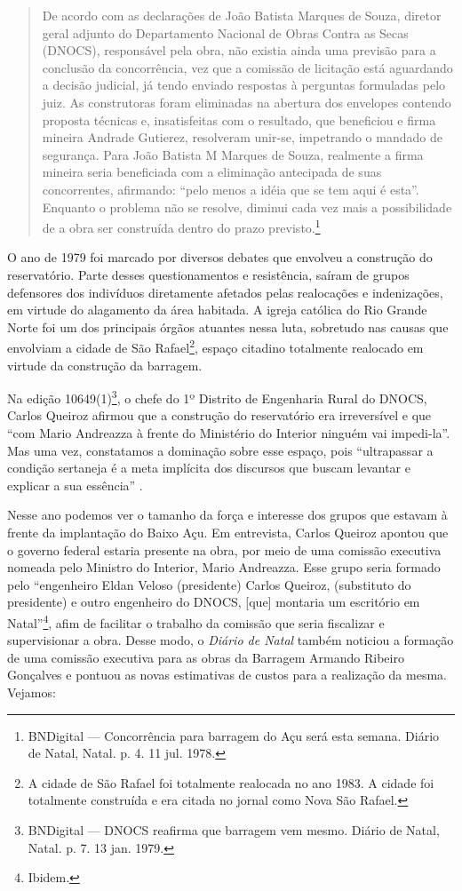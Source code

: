 \begin{refsection}
    \begin{quotation}
        De acordo com as declarações de João Batista Marques de Souza, diretor geral adjunto do Departamento Nacional de Obras Contra as Secas (DNOCS), responsável pela obra, não existia ainda uma previsão para a conclusão da concorrência, vez que a comissão de licitação está aguardando a decisão judicial, já tendo enviado respostas à perguntas formuladas pelo juiz. As construtoras foram eliminadas na abertura dos envelopes contendo proposta técnicas e, insatisfeitas com o resultado, que beneficiou e firma mineira Andrade Gutierez, resolveram unir-se, impetrando o mandado de segurança. Para João Batista M Marques de Souza, realmente a firma mineira seria beneficiada com a eliminação antecipada de suas concorrentes, afirmando: ``pelo menos a idéia que se tem aqui é esta''. Enquanto o problema não se resolve, diminui cada vez mais a possibilidade de a obra ser construída dentro do prazo previsto.\footnote{BNDigital --- Concorrência para barragem do Açu será esta semana. Diário de Natal, Natal. p. 4. 11 jul. 1978. }
    \end{quotation}

    O ano de 1979 foi marcado por diversos debates que envolveu a construção do reservatório. Parte desses questionamentos e resistência, saíram de grupos defensores dos indivíduos diretamente afetados pelas realocações e indenizações, em virtude do alagamento da área habitada. A igreja católica do Rio Grande Norte foi um dos principais órgãos atuantes nessa luta, sobretudo nas causas que envolviam a cidade de São Rafael\footnote{A cidade de São Rafael foi totalmente realocada no ano 1983. A cidade foi totalmente construída e era citada no jornal como Nova São Rafael.}, espaço citadino totalmente realocado em virtude da construção da barragem.  

    Na edição 10649(1)\footnote{BNDigital --- DNOCS reafirma que barragem vem mesmo. Diário de Natal, Natal. p. 7. 13 jan. 1979.}, o chefe do 1º Distrito de Engenharia Rural do DNOCS, Carlos Queiroz afirmou que a construção do reservatório era irreversível e que ``com Mario Andreazza à frente do Ministério do Interior ninguém vai impedi-la''. Mas uma vez, constatamos a dominação sobre esse espaço, pois ``ultrapassar a condição sertaneja é a meta implícita dos discursos que buscam levantar e explicar a sua essência'' \cite[p.~4]{Moraes2003Sertao}.

    Nesse ano podemos ver o tamanho da força e interesse dos grupos que estavam à frente da implantação do Baixo Açu.  Em entrevista, Carlos Queiroz apontou que o governo federal estaria presente na obra, por meio de uma comissão executiva nomeada pelo Ministro do Interior, Mario Andreazza. Esse grupo seria formado pelo ``engenheiro Eldan Veloso (presidente) Carlos Queiroz, (substituto do presidente) e outro engenheiro do DNOCS, [que] montaria um escritório em Natal''\footnote{Ibidem.}, afim de facilitar o trabalho da comissão que seria fiscalizar e supervisionar a obra. Desse modo, o \textit{Diário de Natal} também noticiou a formação de uma comissão executiva para as obras da Barragem Armando Ribeiro Gonçalves e pontuou as novas estimativas de custos para a realização da mesma. Vejamos: 


\end{refsection}
